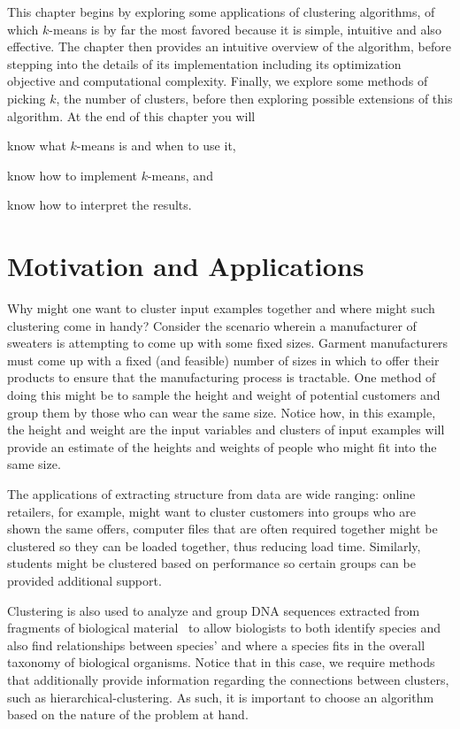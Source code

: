 This chapter begins by exploring some applications of clustering algorithms, of which $k$-means is by far the most favored because it is simple, intuitive and also effective. The chapter then provides an intuitive overview of the algorithm, before stepping into the details of its implementation including its optimization objective and computational complexity. Finally, we explore some methods of picking $k$, the number of clusters, before then exploring possible extensions of this algorithm. At the end of this chapter you will \begin{enumerate*}[label=(\alph*)]
\item know what $k$-means is and when to use it, 
\item know how to implement $k$-means, and
\item know how to interpret the results. 
\end{enumerate*}

\section{Motivation and Applications}

Why might one want to cluster input examples together and where might such clustering come in handy? Consider the scenario wherein a manufacturer of sweaters is attempting to come up with some fixed sizes. Garment manufacturers must come up with a fixed (and feasible) number of sizes in which to offer their products to ensure that the manufacturing process is tractable. One method of doing this might be to sample the height and weight of potential customers and group them by those who can wear the same size. Notice how, in this example, the height and weight are the input variables and clusters of input examples will provide an estimate of the heights and weights of people who might fit into the same size. 

The applications of extracting structure from data are wide ranging: online retailers, for example, might want to cluster customers into groups who are shown the same offers, computer files that are often required together might be clustered so they can be loaded together, thus reducing load time. Similarly, students might be clustered based on performance so certain groups can be provided additional support.

Clustering is also used to analyze and group DNA sequences extracted from fragments of biological material~\cite{mbs:/content/journal/ijsem/10.1099/00207713-47-4-1145} to allow biologists to both identify species and also find relationships between species' and where a species fits in the overall taxonomy of biological organisms. Notice that in this case, we require methods that additionally provide information regarding the connections between clusters, such as hierarchical-clustering. As such, it is important to choose an algorithm based on the nature of the problem at hand. 

